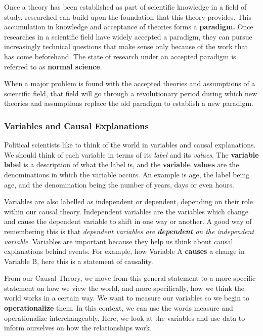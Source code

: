 \documentclass[12pt, letterpaper]{article}
\begin{document}
{\vspace{10pt}
\noindent Once a theory has been established as part of scientific knowledge in a field of study, researched can build upon the foundation that this theory provides. This accumulation in knowledge and acceptance of theories forms a \textbf{paradigm.} Once researches in a scientific field have widely accepted a paradigm, they can pursue increasingly technical questions that make sense only because of the work that has come beforehand. The state of research under an accepted paradigm is referred to as \textbf{normal science}.

\vspace{10pt}
\noindent When a major problem is found with the accepted theories and assumptions of a scientific field, that field will go through a revolutionary period during which new theories and assumptions replace the old paradigm to establish a new paradigm. 

\subsubsection{Variables and Causal Explanations}
Political scientists like to think of the world in variables and causal explanations. We should think of each variable in terms of its \textit{label} and its \textit{values}. The \textbf{variable label} is a description of what the label is, and the \textbf{variable values} are the denominations in which the variable occurs. An example is age, the label being age, and the denomination being the number of years, days or even hours.

\vspace{10pt}
\noindent Variables are also labelled as independent or dependent, depending on their role within our causal theory. Independent variables are the variables which change and cause the dependent variable to shift in one way or another. A good way of remembering this is that \textit{dependent variables are \textbf{dependent} on the independent variable}. Variables are important because they help us think about causal explanations behind events. For example, how Variable A \textbf{causes} a change in Variable B, here this is a statement of causality.

\vspace{10pt}
\noindent From our Causal Theory, we move from this general statement to a more specific statement on how we view the world, and more specifically, how we think the world works in a certain way. We want to measure our variables so we begin to \textbf{operationalize} them. In this context, we can use the words measure and operationalize interchangeably. Here, we look at the variables and use data to inform ourselves on how the relationships work. 


}
\end{document}
